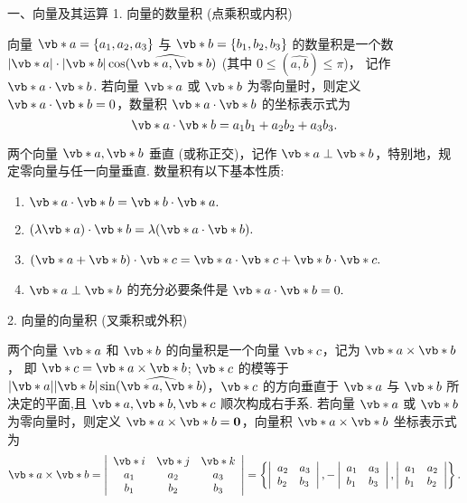 一、向量及其运算
1. 向量的数量积 (点乘积或内积)

向量 $ \vb*{a}=\left\{a_{1}, a_{2}, a_{3}\right\} $ 与 $ \vb*{b}=\left\{b_{1}, b_{2}, b_{3}\right\} $ 的数量积是一个数 $ |\vb*{a}| \cdot|\vb*{b}| \cos (\widehat{\vb*{a}, \vb*{b}}) $ (其中 $ 0 \leqslant(\widehat{a, b}) \leqslant \pi$)，
记作 $ \vb*{a} \cdot \vb*{b} $. 若向量 $ \vb*{a} $ 或 $ \vb*{b} $ 为零向量时，则定义 $ \vb*{a} \cdot \vb*{b}=0$，数量积 $ \vb*{a} \cdot \vb*{b} $ 的坐标表示式为
$$\vb*{a} \cdot \vb*{b}=a_{1} b_{1}+a_{2} b_{2}+a_{3} b_{3} .$$

两个向量 $ \vb*{a}, \vb*{b} $ 垂直 (或称正交)，记作 $ \vb*{a} \perp \vb*{b} $，特别地，规定零向量与任一向量垂直. 
数量积有以下基本性质:
\begin{enumerate}[label=(\arabic{*})]
    \item $\vb*{a} \cdot \vb*{b}=\vb*{b} \cdot \vb*{a} .$
    \item  $(\lambda \vb*{a}) \cdot \vb*{b}=\lambda(\vb*{a} \cdot \vb*{b}) .$
    \item $(\vb*{a}+\vb*{b}) \cdot \vb*{c}=\vb*{a} \cdot \vb*{c}+\vb*{b} \cdot \vb*{c} .$
    \item $\vb*{a} \perp \vb*{b} $ 的充分必要条件是 $ \vb*{a} \cdot \vb*{b}=0 .$
\end{enumerate}

2. 向量的向量积 (叉乘积或外积)

两个向量 $ \vb*{a} $ 和 $ \vb*{b} $ 的向量积是一个向量 $ \vb*{c} $，记为 $ \vb*{a} \times \vb*{b} $，
即 $ \vb*{c}=\vb*{a} \times \vb*{b}$; $\vb*{c} $ 的模等于 $ |\vb*{a}||\vb*{b}| \sin (\widehat{\vb*{a}, \vb*{b}})$，$\vb*{c} $ 的方向垂直于 $ \vb*{a} $ 与 $ \vb*{b} $ 所决定的平面,且 $ \vb*{a}, \vb*{b}, \vb*{c} $ 顺次构成右手系. 
若向量 $ \vb*{a} $ 或 $ \vb*{b} $ 为零向量时，则定义 $ \vb*{a} \times \vb*{b}=\mathbf{0} $，向量积 $ \vb*{a} \times \vb*{b} $ 坐标表示式为
$$
\vb*{a} \times \vb*{b}=\left|\begin{array}{ccc}
\vb*{i} & \vb*{j} & \vb*{k} \\
a_{1} & a_{2} & a_{3} \\
b_{1} & b_{2} & b_{3}
\end{array}\right|=\left\{\left|\begin{array}{ll}
a_{2} & a_{3} \\
b_{2} & b_{3}
\end{array}\right|,-\left|\begin{array}{ll}
a_{1} & a_{3} \\
b_{1} & b_{3}
\end{array}\right|,\left|\begin{array}{ll}
a_{1} & a_{2} \\
b_{1} & b_{2}
\end{array}\right|\right\} .
$$

